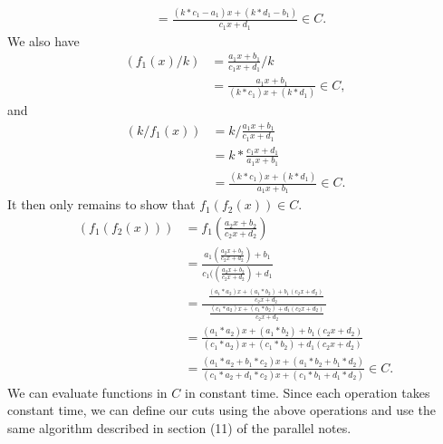 \documentclass{article}
\begin{document}
\begin{enumerate}
\begin{align*}
&=\frac{(k*c_1-a_1)x+(k*d_1-b_1)}{c_1x+d_1}\in C.
\end{align*}
We also have
\begin{align*}
(f_1(x)/k)&=\frac{a_1x+b_1}{c_1x+d_1}/k\\
&=\frac{a_1x+b_1}{(k*c_1)x+(k*d_1)}\in C,
\end{align*}
 and
\begin{align*}
(k/f_1(x))&=k/\frac{a_1x+b_1}{c_1x+d_1}\\
&=k*\frac{c_1x+d_1}{a_1x+b_1}\\
&=\frac{(k*c_1)x+(k*d_1)}{a_1x+b_1}\in C.
\end{align*}
 It then only remains to show that $f_1(f_2(x))\in C$.
\begin{align*}
(f_1(f_2(x)))&=f_1(\frac{a_2x+b_2}{c_2x+d_2})\\
&=\frac{a_1(\frac{a_2x+b_2}{c_2x+d_2})+b_1}{c_1((\frac{a_2x+b_2}{c_2x+d_2})+d_1}\\
&=\frac{\text{\ }\frac{(a_1*a_2)x+(a_1*b_2)+b_1(c_2x+d_2)}{c_2x+d_2}\ }{\text{\ }\frac{(c_1*a_2)x+(c_1*b_2)+d_1(c_2x+d_2)}{c_2x+d_2}}\\
&=\frac{(a_1*a_2)x+(a_1*b_2)+b_1(c_2x+d_2)}{(c_1*a_2)x+(c_1*b_2)+d_1(c_2x+d_2)}\\
&=\frac{(a_1*a_2+b_1*c_2)x+(a_1*b_2+b_1*d_2)}{(c_1*a_2+d_1*c_2)x+(c_1*b_1+d_1*d_2)}\in C.
\end{align*}
We can evaluate functions in $C$ in constant time. Since each operation takes constant time, we can define our cuts using the above operations and use the same algorithm described in section (11) of the parallel notes.
\end{enumerate}
\end{document}
